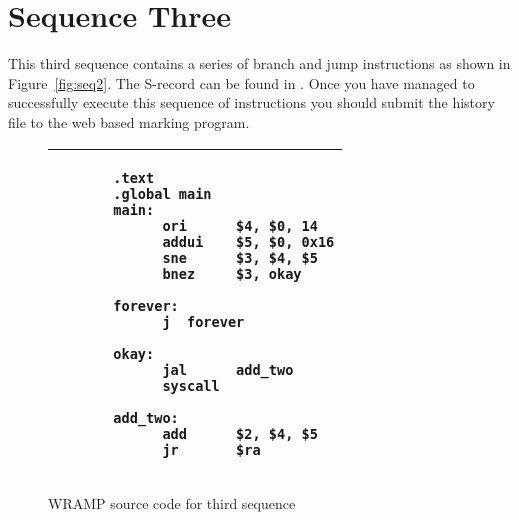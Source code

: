 \documentclass[a4paper,10pt]{article}
\begin{document}
\section{Sequence Three}

This third sequence contains a series of branch and jump instructions
as shown in Figure~\ref{fig:seq2}. The S-record can be found in
. Once you have managed to
successfully execute this sequence of instructions you should submit
the history file to the web based marking program.

\begin{figure}[h]
\begin{footnotesize}
\begin{center}
\begin{tabular}{|p{7cm}|}
\hline
\begin{verbatim}
       .text
       .global main
       main:
             ori      $4, $0, 14
             addui    $5, $0, 0x16
             sne      $3, $4, $5
             bnez     $3, okay

       forever:	
             j  forever

       okay:
             jal      add_two
             syscall

       add_two:
             add      $2, $4, $5
             jr       $ra
\end{verbatim}
\\
\hline
\end{tabular}
\end{center}
\end{footnotesize}
\caption{WRAMP source code for third sequence}
\label{fig:seq3}
\end{figure}
\newpage
\end{document}
